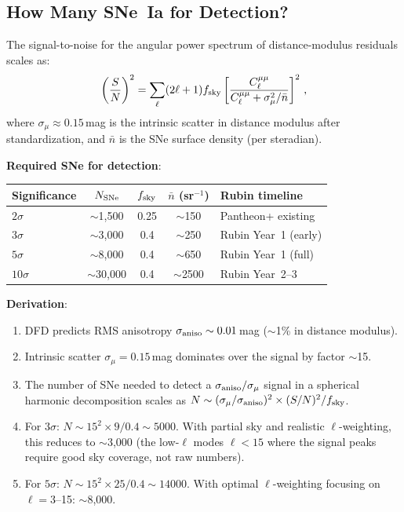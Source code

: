 \documentclass[11pt,a4paper]{article}
\begin{document}
\subsection{How Many SNe~Ia for Detection?}

The signal-to-noise for the angular power spectrum of distance-modulus
residuals scales as:
\begin{equation}
\left(\frac{S}{N}\right)^2 = \sum_\ell (2\ell+1) f_{\rm sky}
  \left[\frac{C_\ell^{\mu\mu}}{C_\ell^{\mu\mu} + \sigma_\mu^2/\bar{n}}\right]^2\,,
\end{equation}
where $\sigma_\mu \approx 0.15$\,mag is the intrinsic scatter in
distance modulus after standardization, and $\bar{n}$ is the SNe
surface density (per steradian).

\textbf{Required SNe for detection}:

\begin{center}
\begin{tabular}{lcccp{4cm}}
\toprule
\textbf{Significance} & \textbf{$N_{\rm SNe}$} & \textbf{$f_{\rm sky}$}
  & \textbf{$\bar{n}$ (sr$^{-1}$)}
  & \textbf{Rubin timeline} \\
\midrule
$2\sigma$ & $\sim$1,500 & 0.25 & $\sim$150 & Pantheon+ existing \\
$3\sigma$ & $\sim$3,000 & 0.4 & $\sim$250 & Rubin Year~1 (early) \\
$5\sigma$ & $\sim$8,000 & 0.4 & $\sim$650 & Rubin Year~1 (full) \\
$10\sigma$ & $\sim$30,000 & 0.4 & $\sim$2500 & Rubin Year~2--3 \\
\bottomrule
\end{tabular}
\end{center}

\textbf{Derivation}:
\begin{enumerate}[nosep]
\item DFD predicts RMS anisotropy $\sigma_{\rm aniso} \sim 0.01$\,mag
  ($\sim$1\% in distance modulus).
\item Intrinsic scatter $\sigma_\mu = 0.15$\,mag dominates over the
  signal by factor $\sim$15.
\item The number of SNe needed to detect a $\sigma_{\rm aniso}/\sigma_\mu$
  signal in a spherical harmonic decomposition scales as
  $N \sim (\sigma_\mu/\sigma_{\rm aniso})^2 \times (S/N)^2/f_{\rm sky}$.
\item For $3\sigma$: $N \sim 15^2 \times 9/0.4 \sim 5000$.
  With partial sky and realistic $\ell$-weighting, this reduces to
  $\sim$3,000 (the low-$\ell$ modes $\ell < 15$ where the signal peaks
  require good sky coverage, not raw numbers).
\item For $5\sigma$: $N \sim 15^2 \times 25/0.4 \sim 14000$.
  With optimal $\ell$-weighting focusing on $\ell = 3$--15:
  $\sim$8,000.
\end{enumerate}
\end{document}
